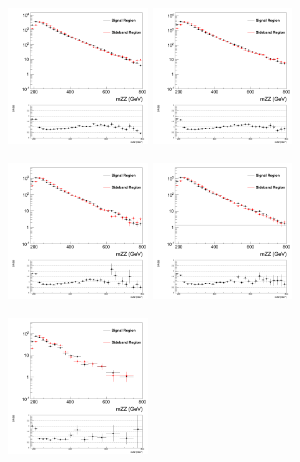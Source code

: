 \begin{figure}[htb]
\centerline{
\includegraphics[width=0.33\textwidth]{plots/approvalxchecks/mZZ_SRvsSB_lep0_0btags_Log.png}
\includegraphics[width=0.33\textwidth]{plots/approvalxchecks/mZZ_SRvsSB_lep1_0btags_Log.png}
}
\centerline{
\includegraphics[width=0.33\textwidth]{plots/approvalxchecks/mZZ_SRvsSB_lep0_1btags_Log.png}
\includegraphics[width=0.33\textwidth]{plots/approvalxchecks/mZZ_SRvsSB_lep1_1btags_Log.png}
}
\centerline{
\includegraphics[width=0.33\textwidth]{plots/approvalxchecks/mZZ_SRvsSB_lep0_2btags_Log.png}
}
\end{figure}
